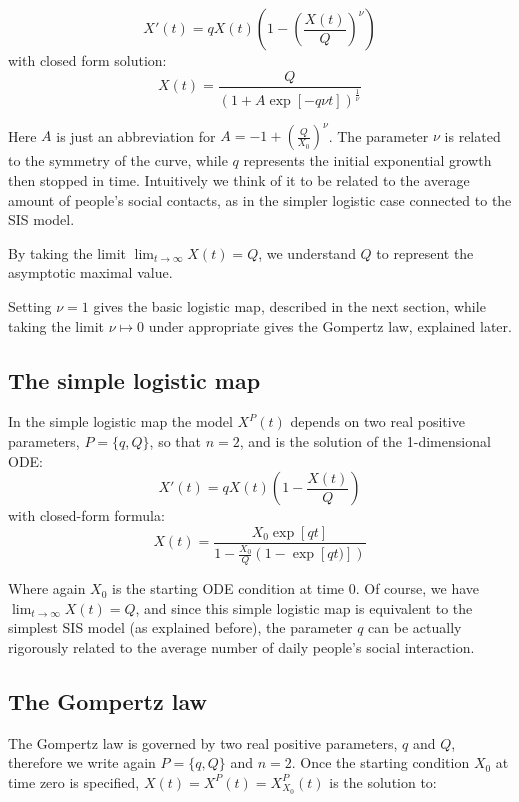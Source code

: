\documentclass[8pt]{article}
\begin{document}
\begin{equation}
	X'(t) = q X(t) 
	\left ( 1 - \left( \frac{X(t)}{Q} \right)^{\nu}\right )
\end{equation}
with closed form solution:
\begin{equation}
	X(t) = \frac{Q} { (1 + A \exp[-q \nu t])^{\frac{1}{\nu}}}
\end{equation}

Here $A$ is just an abbreviation  for
$A = -1 + \left ( \frac{Q} { X_0} \right )^{\nu}$.
The parameter $\nu$ is related to the symmetry of the curve,
while $q$ represents the initial exponential growth then stopped
in time. Intuitively we think of it to be related to the
average amount of people's social contacts, as in the simpler logistic case
connected to the SIS model.


By taking the limit $\lim_{t \to \infty} X(t) = Q$, 
we understand $Q$ to represent the asymptotic maximal value.


Setting $\nu = 1$ gives the basic logistic map, described
in the next section, while taking the limit $\nu \mapsto 0$ 
under appropriate gives the Gompertz law, explained later.



\subsection {The simple logistic map}
In the simple logistic map the model $X^P(t)$ depends on two real positive
parameters, $P = \{ q, Q \}$, so that $n = 2$,
and is the solution of the 1-dimensional ODE:
\begin{equation}
	X'(t)  = q X(t) \left ( 1 - \frac{X(t)}{Q} \right )
\end{equation}
with closed-form formula:
\begin{equation}
X(t) = \frac{X_0 \exp[q t]}
	{1-\frac{X_0}{Q} (1-\exp[q t)])}
\end{equation}


Where again $X_0$ is the starting ODE condition at time $0$.
Of course, we have $\lim_{t \to \infty} X(t) = Q$,
and since this simple logistic map is equivalent to the simplest SIS
model (as explained before), the parameter $q$ can be actually
rigorously related to the average number of daily people's social interaction.


\subsection{The Gompertz law}
The Gompertz law is governed by two real positive parameters,
$q$ and $Q$, therefore we write again $P = \{q, Q\}$ and $n = 2$.
Once the starting condition $X_0$ at time zero
is specified, $X(t) = X^P(t) = X_{X_0}^P(t)$ is the solution to:
\end{document}
